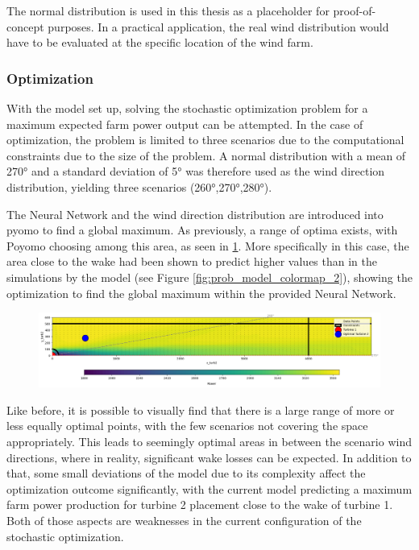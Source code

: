 The normal distribution is used in this thesis as a placeholder for proof-of-concept purposes. In a practical application, the real wind distribution would have to be evaluated at the specific location of the wind farm. 

\subsubsection{Optimization}

With the model set up, solving the stochastic optimization problem for a maximum expected farm power output can be attempted. In the case of optimization, the problem is limited to three scenarios due to the computational constraints due to the size of the problem. A normal distribution with a mean of 270° and  a standard deviation of 5° was therefore used as the wind direction distribution, yielding three scenarios (260°,270°,280°).

The Neural Network and the wind direction distribution are introduced into pyomo to find a global maximum. As previously, a range of optima exists, with Poyomo choosing among this area, as seen in \ref{fig:prob_data_lininter}. More specifically in this case, the area close to the wake had been shown to predict higher values than in the simulations by the model (see Figure \ref{fig:prob_model_colormap_2}), showing the optimization to find the global maximum within the provided Neural Network. 

\begin{figure}[h] 
	\centering
	\includegraphics[width=1\textwidth]{figures/optimization/prob_data_lininter.png} 
	\caption{}
	\label{fig:prob_data_lininter}
\end{figure}

Like before, it is possible to visually find that there is a large range of more or less equally optimal points, with the few scenarios not covering the space appropriately. This leads to seemingly optimal areas in between the scenario wind directions, where in reality, significant wake losses can be expected. In addition to that, some small deviations of the model due to its complexity affect the optimization outcome significantly, with the current model predicting a maximum farm power production for turbine 2 placement close to the wake of turbine 1. Both of those aspects are weaknesses in the current configuration of the stochastic optimization.
	
